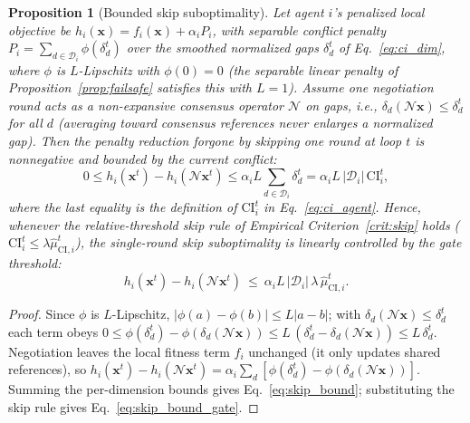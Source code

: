 \documentclass[conference]{IEEEtran}
\newtheorem{proposition}{Proposition}
\begin{document}
\begin{proposition}[Bounded skip suboptimality]\label{prop:skip}
Let agent $i$'s penalized local objective be $h_i(\mathbf{x})=f_i(\mathbf{x})+\alpha_i P_i$, with separable conflict penalty $P_i=\sum_{d\in\mathcal{D}_i}\phi(\delta_d^t)$ over the smoothed normalized gaps $\delta_d^t$ of Eq.~\eqref{eq:ci_dim}, where $\phi$ is $L$-Lipschitz with $\phi(0)=0$ (the separable linear penalty of Proposition~\ref{prop:failsafe} satisfies this with $L=1$). Assume one negotiation round acts as a non-expansive consensus operator $\mathcal{N}$ on gaps, i.e., $\delta_d(\mathcal{N}\mathbf{x})\le \delta_d^t$ for all $d$ (averaging toward consensus references never enlarges a normalized gap). Then the penalty reduction forgone by skipping one round at loop $t$ is nonnegative and bounded by the current conflict:
\begin{equation}
0\le h_i(\mathbf{x}^t)-h_i(\mathcal{N}\mathbf{x}^t)\le \alpha_i L\sum_{d\in\mathcal{D}_i} \delta_d^t = \alpha_i L\,|\mathcal{D}_i|\,\mathrm{CI}_i^t,
\label{eq:skip_bound}
\end{equation}
where the last equality is the definition of $\mathrm{CI}_i^t$ in Eq.~\eqref{eq:ci_agent}. Hence, whenever the relative-threshold skip rule of Empirical Criterion~\ref{crit:skip} holds ($\mathrm{CI}_i^t\le\lambda\hat{\mu}_{\mathrm{CI},i}^t$), the single-round skip suboptimality is linearly controlled by the gate threshold:
\begin{equation}
h_i(\mathbf{x}^t)-h_i(\mathcal{N}\mathbf{x}^t)\ \le\ \alpha_i L\,|\mathcal{D}_i|\,\lambda\,\hat{\mu}_{\mathrm{CI},i}^t.
\label{eq:skip_bound_gate}
\end{equation}
\end{proposition}
\begin{proof}
Since $\phi$ is $L$-Lipschitz, $|\phi(a)-\phi(b)|\le L|a-b|$; with $\delta_d(\mathcal{N}\mathbf{x})\le\delta_d^t$ each term obeys $0\le\phi(\delta_d^t)-\phi(\delta_d(\mathcal{N}\mathbf{x}))\le L\,(\delta_d^t-\delta_d(\mathcal{N}\mathbf{x}))\le L\,\delta_d^t$. Negotiation leaves the local fitness term $f_i$ unchanged (it only updates shared references), so $h_i(\mathbf{x}^t)-h_i(\mathcal{N}\mathbf{x}^t)=\alpha_i\sum_d[\phi(\delta_d^t)-\phi(\delta_d(\mathcal{N}\mathbf{x}))]$. Summing the per-dimension bounds gives Eq.~\eqref{eq:skip_bound}; substituting the skip rule gives Eq.~\eqref{eq:skip_bound_gate}.
\end{proof}
\end{document}
